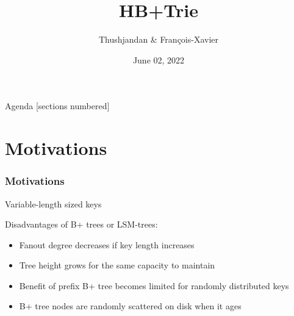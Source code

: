 \documentclass[aspectratio=169]{beamer}
\title{HB+Trie}
\date{June 02, 2022}
\author{Thushjandan \& François-Xavier}
\institute{Data Management Data Structures}
\begin{document}
\maketitle

\begin{frame}{Agenda}
    [sections numbered]
    \tableofcontents
\end{frame}
\section{Motivations}
\begin{frame}[t]
    \frametitle{Motivations}
       Variable-length sized keys
    
    Disadvantages of B+ trees or LSM-trees:
    \begin{itemize}
    	\item Fanout degree decreases if key length increases
    	\item Tree height grows for the same capacity to maintain
    	\item Benefit of prefix B+ tree becomes limited for randomly distributed keys
    	\item B+ tree nodes are randomly scattered on disk when it ages 
    \end{itemize}
\end{frame}
\end{document}
